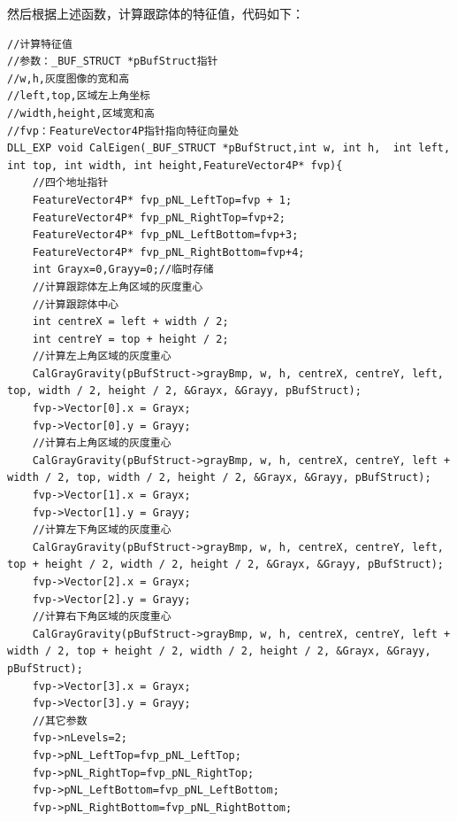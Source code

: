 \documentclass[12pt,hyperref,a4paper,UTF8]{ctexart}
\begin{document}
        然后根据上述函数，计算跟踪体的特征值，代码如下：
        \begin{lstlisting}[caption={跟踪体特征提取函数}, label={lst:example}]
//计算特征值
//参数：_BUF_STRUCT *pBufStruct指针
//w,h,灰度图像的宽和高
//left,top,区域左上角坐标
//width,height,区域宽和高
//fvp：FeatureVector4P指针指向特征向量处
DLL_EXP void CalEigen(_BUF_STRUCT *pBufStruct,int w, int h,  int left, int top, int width, int height,FeatureVector4P* fvp){
    //四个地址指针
    FeatureVector4P* fvp_pNL_LeftTop=fvp + 1;
    FeatureVector4P* fvp_pNL_RightTop=fvp+2;
    FeatureVector4P* fvp_pNL_LeftBottom=fvp+3;
    FeatureVector4P* fvp_pNL_RightBottom=fvp+4;
    int Grayx=0,Grayy=0;//临时存储
    //计算跟踪体左上角区域的灰度重心
    //计算跟踪体中心
    int centreX = left + width / 2;
    int centreY = top + height / 2;
    //计算左上角区域的灰度重心
    CalGrayGravity(pBufStruct->grayBmp, w, h, centreX, centreY, left, top, width / 2, height / 2, &Grayx, &Grayy, pBufStruct);
    fvp->Vector[0].x = Grayx;
    fvp->Vector[0].y = Grayy;
    //计算右上角区域的灰度重心
    CalGrayGravity(pBufStruct->grayBmp, w, h, centreX, centreY, left + width / 2, top, width / 2, height / 2, &Grayx, &Grayy, pBufStruct);
    fvp->Vector[1].x = Grayx;
    fvp->Vector[1].y = Grayy;
    //计算左下角区域的灰度重心
    CalGrayGravity(pBufStruct->grayBmp, w, h, centreX, centreY, left, top + height / 2, width / 2, height / 2, &Grayx, &Grayy, pBufStruct);
    fvp->Vector[2].x = Grayx;
    fvp->Vector[2].y = Grayy;
    //计算右下角区域的灰度重心
    CalGrayGravity(pBufStruct->grayBmp, w, h, centreX, centreY, left + width / 2, top + height / 2, width / 2, height / 2, &Grayx, &Grayy, pBufStruct);
    fvp->Vector[3].x = Grayx;
    fvp->Vector[3].y = Grayy;
    //其它参数
    fvp->nLevels=2;
    fvp->pNL_LeftTop=fvp_pNL_LeftTop;
    fvp->pNL_RightTop=fvp_pNL_RightTop;
    fvp->pNL_LeftBottom=fvp_pNL_LeftBottom;
    fvp->pNL_RightBottom=fvp_pNL_RightBottom;


\end{lstlisting}
\end{document}
